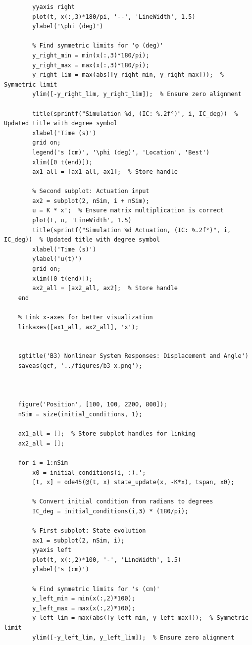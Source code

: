\documentclass{article}
\begin{document}
\begin{verbatim}
        yyaxis right
        plot(t, x(:,3)*180/pi, '--', 'LineWidth', 1.5)
        ylabel('\phi (deg)')
    
        % Find symmetric limits for 'φ (deg)'
        y_right_min = min(x(:,3)*180/pi);
        y_right_max = max(x(:,3)*180/pi);
        y_right_lim = max(abs([y_right_min, y_right_max]));  % Symmetric limit
        ylim([-y_right_lim, y_right_lim]);  % Ensure zero alignment
    
        title(sprintf("Simulation %d, (IC: %.2f°)", i, IC_deg))  % Updated title with degree symbol
        xlabel('Time (s)')
        grid on;
        legend('s (cm)', '\phi (deg)', 'Location', 'Best')
        xlim([0 t(end)]); 
        ax1_all = [ax1_all, ax1];  % Store handle
    
        % Second subplot: Actuation input
        ax2 = subplot(2, nSim, i + nSim);
        u = K * x';  % Ensure matrix multiplication is correct
        plot(t, u, 'LineWidth', 1.5)
        title(sprintf("Simulation %d Actuation, (IC: %.2f°)", i, IC_deg))  % Updated title with degree symbol
        xlabel('Time (s)')
        ylabel('u(t)')
        grid on;
        xlim([0 t(end)]);
        ax2_all = [ax2_all, ax2];  % Store handle
    end
    
    % Link x-axes for better visualization
    linkaxes([ax1_all, ax2_all], 'x');


    sgtitle('B3) Nonlinear System Responses: Displacement and Angle')
    saveas(gcf, '../figures/b3_x.png');



    figure('Position', [100, 100, 2200, 800]);
    nSim = size(initial_conditions, 1);
    
    ax1_all = [];  % Store subplot handles for linking
    ax2_all = [];
    
    for i = 1:nSim
        x0 = initial_conditions(i, :).';
        [t, x] = ode45(@(t, x) state_update(x, -K*x), tspan, x0);
    
        % Convert initial condition from radians to degrees
        IC_deg = initial_conditions(i,3) * (180/pi);
    
        % First subplot: State evolution
        ax1 = subplot(2, nSim, i);
        yyaxis left
        plot(t, x(:,2)*100, '-', 'LineWidth', 1.5)
        ylabel('s (cm)')
    
        % Find symmetric limits for 's (cm)'
        y_left_min = min(x(:,2)*100);
        y_left_max = max(x(:,2)*100);
        y_left_lim = max(abs([y_left_min, y_left_max]));  % Symmetric limit
        ylim([-y_left_lim, y_left_lim]);  % Ensure zero alignment
    

\end{verbatim}
\end{document}
